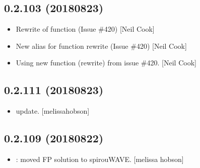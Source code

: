 \documentclass[a4paper,10pt,english]{report}
\begin{document}
\subsection{0.2.103 (2018\sphinxhyphen{}08\sphinxhyphen{}23)}
\label{\detokenize{misc/changelog:id376}}\begin{itemize}
\item {} 
Re\sphinxhyphen{}write of  function (Issue \#420) {[}Neil Cook{]}

\item {} 
New alias for function re\sphinxhyphen{}write (Issue \#420) {[}Neil Cook{]}

\item {} 
Using new function (re\sphinxhyphen{}write) from issue \#420. {[}Neil Cook{]}

\end{itemize}


\subsection{0.2.111 (2018\sphinxhyphen{}08\sphinxhyphen{}23)}
\label{\detokenize{misc/changelog:id377}}\begin{itemize}
\item {} 
 update. {[}melissa\sphinxhyphen{}hobson{]}

\end{itemize}


\subsection{0.2.109 (2018\sphinxhyphen{}08\sphinxhyphen{}22)}
\label{\detokenize{misc/changelog:id378}}\begin{itemize}
\item {} 
: moved FP solution to spirouWAVE. {[}melissa\sphinxhyphen{}
hobson{]}

\end{itemize}
\end{document}
